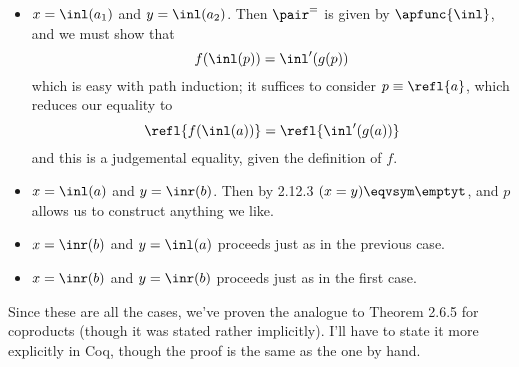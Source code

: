 \begin{itemize}
\item  $x = \inl(a_{1})$ and $y = \inl(a_{2})$.  Then $\pair^{=}$ is given by
  $\apfunc{\inl}$, and we must show that
  \[
    f(\inl(p)) = \inl'(g(p))
  \]
  which is easy with path induction; it suffices to consider $p \equiv
  \refl{a}$, which reduces our equality to
  \[
    \refl{f(\inl(a))} = \refl{\inl'(g(a))}
  \]
  and this is a judgemental equality, given the definition of $f$.



\item  $x = \inl(a)$ and $y = \inr(b)$.  Then by 2.12.3 $(x = y) \eqvsym \emptyt$,
  and $p$ allows us to construct anything we like.



\item  $x = \inr(b)$ and $y = \inl(a)$ proceeds just as in the previous case.



\item  $x = \inr(b)$ and $y = \inr(b)$ proceeds just as in the first case.

\end{itemize}
Since these are all the cases, we've proven the analogue to Theorem 2.6.5 for
coproducts (though it was stated rather implicitly).  I'll have to state it
more explicitly in Coq, though the proof is the same as the one by
hand.
